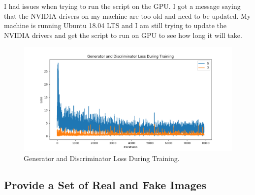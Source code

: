\documentclass[12pt]{article}
\begin{document}
			I had issues when trying to run the script on the GPU. I got a message saying that the NVIDIA drivers on my machine are too old and need to be updated. My machine is running Ubuntu 18.04 LTS and I am still trying to update the NVIDIA drivers and get the script to run on GPU to see how long it will take.
			
			\begin{figure}[H]
				\begin{framed}
					\centering
					\includegraphics[totalheight=6cm]{Plot.png}
				\end{framed}
				\caption{Generator and Discriminator Loss During Training.}
			\end{figure}
		
			
			
		\subsection{Provide a Set of Real and Fake Images}
		 
\end{document}
